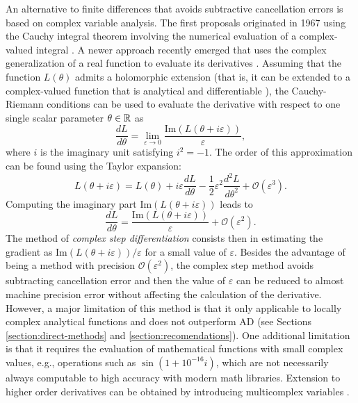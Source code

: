 An alternative to finite differences that avoids subtractive cancellation errors is based on complex variable analysis. 
The first proposals originated in 1967 using the Cauchy integral theorem involving the numerical evaluation of a complex-valued integral \cite{Lyness_1967, Lyness_Moler_1967}.
A newer approach recently emerged that uses the complex generalization of a real function to evaluate its derivatives \cite{Squire_Trapp_1998_complex_diff, Martins_Sturdza_Alonso_2003_complex_differentiation}. 
Assuming that the function $L(\theta)$ admits a holomorphic extension (that is, it can be extended to a complex-valued function that is analytical and differentiable \cite{stein2010complex}), the Cauchy-Riemann conditions can be used to evaluate the derivative with respect to one single scalar parameter $\theta \in \operatorname{\mathbb{R}}$ as
\begin{equation}
    \frac{dL}{d\theta} = \lim_{\varepsilon \rightarrow 0} \frac{\text{Im}(L(\theta + i \varepsilon))}{\varepsilon},
\end{equation}
where $i$ is the imaginary unit satisfying $i^2 = -1$. 
The order of this approximation can be found using the Taylor expansion:
\begin{equation}
    L(\theta + i \varepsilon)
    = 
    L(\theta) + i \varepsilon \frac{dL}{d\theta} 
    - 
    \frac 1 2  \varepsilon^2
    \frac{d^2 L}{d\theta^2}
    + 
    \mathcal O (\varepsilon^3).
\end{equation}
Computing the imaginary part $\text{Im}(L(\theta + i \varepsilon))$ leads to
\begin{equation}
    \frac{dL}{d\theta} 
    = 
    \frac{\text{Im}(L(\theta + i \varepsilon))}{\varepsilon}
    + 
    \mathcal{O} (\varepsilon^2).
    \label{eq:complex-step-definition}
\end{equation}
The method of \textit{complex step differentiation} consists then in estimating the gradient as $\text{Im}(L(\theta + i \varepsilon)) / \varepsilon$ for a small value of $\varepsilon$. 
Besides the advantage of being a method with precision $\mathcal{O}(\varepsilon^2)$, the complex step method avoids subtracting cancellation error and then the value of $\varepsilon$ can be reduced to almost machine precision error without affecting the calculation of the derivative. 
However, a major limitation of this method is that it only applicable to locally complex analytical functions \cite{Martins_Sturdza_Alonso_2003_complex_differentiation} and does not outperform AD (see Sections \ref{section:direct-methods} and \ref{section:recomendations}). 
One additional limitation is that it requires the evaluation of mathematical functions with small complex values, e.g., operations such as $\sin(1 + 10^{-16} i)$, which are not necessarily always computable to high accuracy with modern math libraries.
Extension to higher order derivatives can be obtained by introducing multicomplex variables \cite{Lantoine_Russell_Dargent_2012}. 

